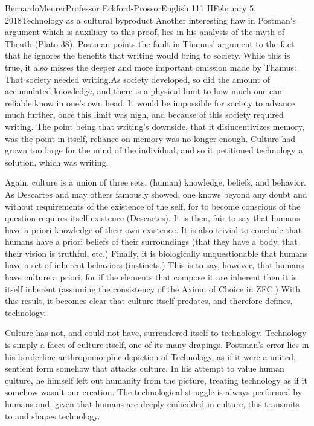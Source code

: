 \documentclass[12pt,letterpaper]{article}
\begin{document}
\begin{mla}{Bernardo}{Meurer}{Professor Eckford-Prossor}{English 111 H}{February 5, 2018}{Technology as a cultural byproduct}
    Another interesting flaw in Postman's argument which is auxiliary to this proof, lies in his analysis of the myth of Theuth (Plato 38). Postman points the fault in Thamus' argument to the fact that he ignores the benefits that writing would bring to society. While this is true, it also misses the deeper and more important omission made by Thamus: That society needed writing.As society developed, so did the amount of accumulated knowledge, and there is a physical limit to how much one can reliable know in one's own head. It would be impossible for society to advance much further, once this limit was nigh, and because of this society required writing. The point being that writing's downside, that it disincentivizes memory, was the point in itself, reliance on memory was no longer enough. Culture had grown too large for the mind of the individual, and so it petitioned technology a solution, which was writing.

    Again, culture is a union of three sets, (human) knowledge, beliefs, and behavior. As Descartes and may others famously showed, one knows beyond any doubt and without requirements of the existence of the self, for to become conscious of the question requires itself existence (Descartes). It is then, fair to say that humans have a priori knowledge of their own existence. It is also trivial to conclude that humans have a priori beliefs of their surroundings (that they have a body, that their vision is truthful, etc.) Finally, it is biologically unquestionable that humans have a set of inherent behaviors (instincts.) This is to say, however, that humans have culture a priori, for if the elements that compose it are inherent then it is itself inherent (assuming the consistency of the Axiom of Choice in ZFC.) With this result, it becomes clear that culture itself predates, and therefore defines, technology.

    Culture has not, and could not have, surrendered itself to technology. Technology is simply a facet of culture itself, one of its many drapings. Postman's error lies in his borderline anthropomorphic depiction of Technology, as if it were a united, sentient form somehow that attacks culture. In his attempt to value human culture, he himself left out humanity from the picture, treating technology as if it somehow wasn't our creation. The technological struggle is always performed by humans and, given that humans are deeply embedded in culture, this transmits to and shapes technology.

    \begin{workscited}


\end{workscited}
\end{mla}
\end{document}
